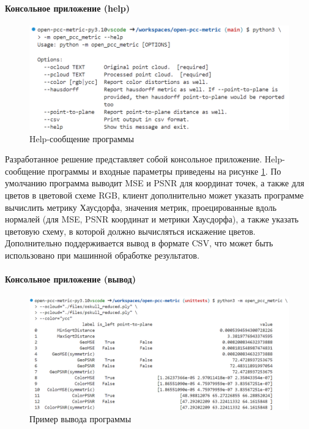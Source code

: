 \documentclass[a4paper,12pt]{extreport}
\begin{document}
\paragraph{Консольное приложение (help)}

\begin{figure}[H]
    \centering
    \includegraphics[width=0.7\linewidth]{assets/open_pcc_metric_help.png}
    \caption{Help-сообщение программы}
    \label{img:pcc_metric_help}
\end{figure}

Разработанное решение представляет собой консольное приложение. Help-сообщение
программы и входные параметры приведены на рисунке \ref{img:pcc_metric_help}. По
умолчанию программа выводит MSE и PSNR для координат точек, а также для цветов в
цветовой схеме RGB, клиент дополнительно может указать программе вычислить
метрику Хаусдорфа, значения метрик, проецированные вдоль нормалей (для MSE, PSNR
координат и метрики Хаусдорфа), а также указать цветовую схему, в которой должно
вычисляться искажение цветов. Дополнительно поддерживается вывод в формате CSV,
что может быть использовано при машинной обработке результатов.

\paragraph{Консольное приложение (вывод)}

\begin{figure}[H]
    \centering
    \includegraphics[width=0.7\linewidth]{assets/open_pcc_metric_output.png}
    \caption{Пример вывода программы}
    \label{img:pcc_metric_output}
\end{figure}
\end{document}
